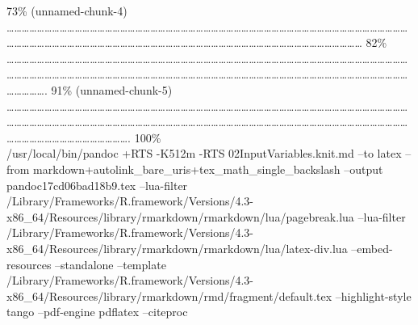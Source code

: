 \documentclass[
]{article}
\begin{document}
\textbar{} 73\% (unnamed-chunk-4) \textbar{}
\textbar\ldots\ldots\ldots\ldots\ldots\ldots\ldots\ldots\ldots\ldots\ldots\ldots\ldots\ldots\ldots\ldots\ldots\ldots\ldots\ldots\ldots\ldots\ldots\ldots\ldots\ldots\ldots\ldots\ldots\ldots\ldots\ldots\ldots\ldots\ldots\ldots\ldots\ldots\ldots\ldots\ldots\ldots\ldots\ldots\ldots\ldots\ldots\ldots\ldots\ldots\ldots\ldots\ldots\ldots\ldots\ldots\ldots\ldots\ldots\ldots\ldots\ldots\ldots\ldots\ldots\ldots\ldots\ldots\ldots\ldots\ldots\ldots\ldots\ldots\ldots\ldots\ldots\ldots\ldots\ldots\ldots\ldots\ldots\ldots\ldots\ldots\ldots\ldots\ldots\ldots\ldots\ldots\ldots\ldots\ldots\ldots\ldots\ldots\ldots\ldots{}
\textbar{} 82\% \textbar{}
\textbar\ldots\ldots\ldots\ldots\ldots\ldots\ldots\ldots\ldots\ldots\ldots\ldots\ldots\ldots\ldots\ldots\ldots\ldots\ldots\ldots\ldots\ldots\ldots\ldots\ldots\ldots\ldots\ldots\ldots\ldots\ldots\ldots\ldots\ldots\ldots\ldots\ldots\ldots\ldots\ldots\ldots\ldots\ldots\ldots\ldots\ldots\ldots\ldots\ldots\ldots\ldots\ldots\ldots\ldots\ldots\ldots\ldots\ldots\ldots\ldots\ldots\ldots\ldots\ldots\ldots\ldots\ldots\ldots\ldots\ldots\ldots\ldots\ldots\ldots\ldots\ldots\ldots\ldots\ldots\ldots\ldots\ldots\ldots\ldots\ldots\ldots\ldots\ldots\ldots\ldots\ldots\ldots\ldots\ldots\ldots\ldots\ldots\ldots\ldots\ldots\ldots\ldots\ldots\ldots\ldots\ldots\ldots\ldots\ldots\ldots\ldots.
\textbar{} 91\% (unnamed-chunk-5) \textbar{}
\textbar\ldots\ldots\ldots\ldots\ldots\ldots\ldots\ldots\ldots\ldots\ldots\ldots\ldots\ldots\ldots\ldots\ldots\ldots\ldots\ldots\ldots\ldots\ldots\ldots\ldots\ldots\ldots\ldots\ldots\ldots\ldots\ldots\ldots\ldots\ldots\ldots\ldots\ldots\ldots\ldots\ldots\ldots\ldots\ldots\ldots\ldots\ldots\ldots\ldots\ldots\ldots\ldots\ldots\ldots\ldots\ldots\ldots\ldots\ldots\ldots\ldots\ldots\ldots\ldots\ldots\ldots\ldots\ldots\ldots\ldots\ldots\ldots\ldots\ldots\ldots\ldots\ldots\ldots\ldots\ldots\ldots\ldots\ldots\ldots\ldots\ldots\ldots\ldots\ldots\ldots\ldots\ldots\ldots\ldots\ldots\ldots\ldots\ldots\ldots\ldots\ldots\ldots\ldots\ldots\ldots\ldots\ldots\ldots\ldots\ldots\ldots\ldots\ldots\ldots\ldots\ldots\ldots\ldots\ldots\ldots\ldots\ldots.\textbar{}
100\%\\
/usr/local/bin/pandoc +RTS -K512m -RTS 02InputVariables.knit.md --to
latex --from markdown+autolink\_bare\_uris+tex\_math\_single\_backslash
--output pandoc17cd06bad18b9.tex --lua-filter
/Library/Frameworks/R.framework/Versions/4.3-x86\_64/Resources/library/rmarkdown/rmarkdown/lua/pagebreak.lua
--lua-filter
/Library/Frameworks/R.framework/Versions/4.3-x86\_64/Resources/library/rmarkdown/rmarkdown/lua/latex-div.lua
--embed-resources --standalone --template
/Library/Frameworks/R.framework/Versions/4.3-x86\_64/Resources/library/rmarkdown/rmd/fragment/default.tex
--highlight-style tango --pdf-engine pdflatex --citeproc
\end{document}
